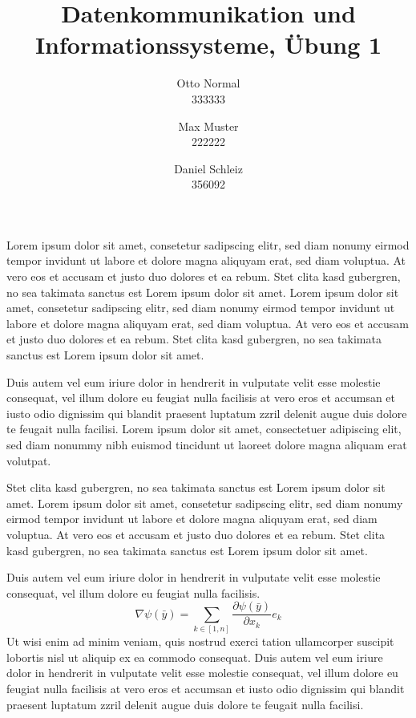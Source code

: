 \documentclass{../exercisesheet}
\title{Datenkommunikation und Informationssysteme, Übung 1}
\author{
    Otto Normal \\ 333333
    \and
    Max Muster \\ 222222
    \and 
    Daniel Schleiz \\ 356092
}
\begin{document}
\maketitle
\pointtable

\begin{exercise}{10}
	\begin{subexercise}
		Lorem ipsum dolor sit amet, consetetur sadipscing elitr, sed diam nonumy eirmod tempor invidunt ut labore et dolore magna aliquyam erat, 
		sed diam voluptua. At vero eos et accusam et justo duo dolores et ea rebum. Stet clita kasd gubergren, no sea takimata sanctus est Lorem 
		ipsum dolor sit amet. Lorem ipsum dolor sit amet, consetetur sadipscing elitr, sed diam nonumy eirmod tempor invidunt ut labore et dolore 
		magna aliquyam erat, sed diam voluptua. At vero eos et accusam et justo duo dolores et ea rebum. Stet clita kasd gubergren, no sea takimata sanctus est Lorem ipsum dolor sit amet.
	\end{subexercise}

	\begin{subexercise}
		Duis autem vel eum iriure dolor in hendrerit in vulputate velit esse molestie consequat, vel illum dolore eu feugiat nulla facilisis 
		at vero eros et accumsan et iusto odio dignissim qui blandit praesent luptatum zzril delenit augue duis dolore te feugait nulla facilisi. 
		Lorem ipsum dolor sit amet, consectetuer adipiscing elit, sed diam nonummy nibh euismod tincidunt ut laoreet dolore magna aliquam erat volutpat.   
	\end{subexercise}

	\begin{subexercise}
		Stet clita kasd gubergren, no sea takimata sanctus est Lorem ipsum dolor sit amet. Lorem ipsum dolor sit amet, 
		consetetur sadipscing elitr, sed diam nonumy eirmod tempor invidunt ut labore et dolore magna aliquyam erat, sed diam voluptua. 
		At vero eos et accusam et justo duo dolores et ea rebum. Stet clita kasd gubergren, no sea takimata sanctus est Lorem ipsum dolor sit amet.
	\end{subexercise}
\end{exercise}


\begin{exercise}{12}
	\begin{subexercise}
		Duis autem vel eum iriure dolor in hendrerit in vulputate velit esse molestie consequat, vel illum dolore eu feugiat nulla facilisis.
		$$ \nabla \psi(\bar y) = \sum_{k \in [1,n]} \frac{\partial\psi(\bar y)}{\partial x_k}e_k$$
		Ut wisi enim ad minim veniam, quis nostrud exerci tation ullamcorper suscipit lobortis nisl ut aliquip ex ea commodo consequat. 
		Duis autem vel eum iriure dolor in hendrerit in vulputate velit esse molestie consequat, vel illum dolore eu feugiat nulla facilisis at 
		vero eros et accumsan et iusto odio dignissim qui blandit praesent luptatum zzril delenit augue duis dolore te feugait nulla facilisi.
	\end{subexercise}
\end{exercise}
\end{document}
